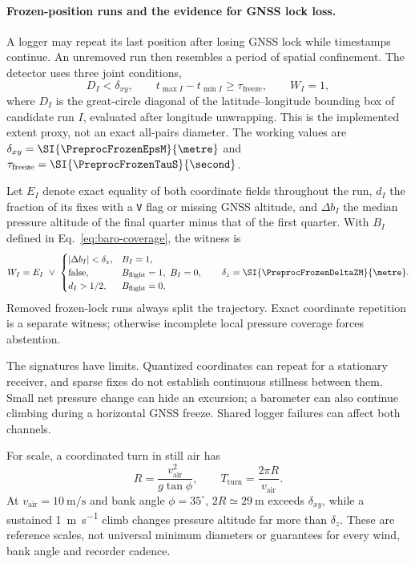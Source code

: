 \begin{revblock}
\paragraph{Frozen-position runs and the evidence for GNSS lock loss.}
A logger may repeat its last position after losing GNSS lock while timestamps continue.
An unremoved run then resembles a period of spatial confinement. The detector uses
three joint conditions,
\begin{equation}
 \label{eq:frozenlock}
 D_I<\delta_{xy},\qquad t_{\max I}-t_{\min I}\ge\tau_{\mathrm{freeze}},\qquad W_I=1,
\end{equation}
where $D_I$ is the great-circle diagonal of the latitude--longitude bounding box of
candidate run $I$, evaluated after longitude unwrapping. This is the implemented
extent proxy, not an exact all-pairs diameter. The working values are
$\delta_{xy}=\SI{\PreprocFrozenEpsM}{\metre}$ and
$\tau_{\mathrm{freeze}}=\SI{\PreprocFrozenTauS}{\second}$.

Let $E_I$ denote exact equality of both coordinate fields throughout the run,
$d_I$ the fraction of its fixes with a \texttt{V} flag or missing GNSS altitude, and
$\Delta b_I$ the median pressure altitude of the final quarter minus that of the first
quarter. With $B_I$ defined in Eq.~\eqref{eq:baro-coverage}, the witness is
\begin{equation}
 W_I=E_I\ \lor\
 \begin{cases}
  |\Delta b_I|<\delta_z, & B_I=1,\\
  \mathrm{false}, & B_{\mathrm{flight}}=1,\ B_I=0,\\
  d_I>1/2, & B_{\mathrm{flight}}=0,
 \end{cases}
 \qquad \delta_z=\SI{\PreprocFrozenDeltaZM}{\metre}.
 \label{eq:frozen-witness}
\end{equation}
Removed frozen-lock runs always split the trajectory. Exact coordinate repetition
is a separate witness; otherwise incomplete local pressure coverage forces abstention.

The signatures have limits. Quantized coordinates can repeat for a stationary receiver,
and sparse fixes do not establish continuous stillness between them. Small net pressure
change can hide an excursion; a barometer can also continue climbing during a horizontal
GNSS freeze. Shared logger failures can affect both channels.

For scale, a coordinated turn in still air has
\begin{equation}
 R=\frac{v_{\mathrm{air}}^2}{g\tan\phi},\qquad
 T_{\mathrm{turn}}=\frac{2\pi R}{v_{\mathrm{air}}}.
 \label{eq:turn-radius-cleaning}
\end{equation}
At $v_{\mathrm{air}}=\SI{10}{\metre\per\second}$ and bank angle $\phi=35^\circ$,
$2R\simeq\SI{29}{\metre}$ exceeds $\delta_{xy}$, while a sustained
\SI{1}{\metre\per\second} climb changes pressure altitude far more than $\delta_z$.
These are reference scales, not universal minimum diameters or guarantees for every
wind, bank angle and recorder cadence.


\end{revblock}
